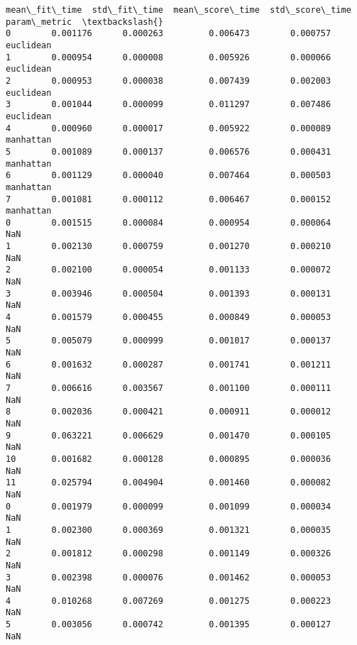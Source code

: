 \documentclass[11pt]{article}
\makeatletter
\newcommand{\boxspacing}{\kern\kvtcb@left@rule\kern\kvtcb@boxsep}
\newcommand{\prompt}[4]{
        {\ttfamily\llap{{\color{#2}[#3]:\hspace{3pt}#4}}\vspace{-\baselineskip}}
    }
\makeatother
\begin{document}
            \begin{tcolorbox}[breakable, size=fbox, boxrule=.5pt, pad at break*=1mm, opacityfill=0]
\prompt{Out}{outcolor}{35}{\boxspacing}
\begin{Verbatim}[commandchars=\\\{\}]
    mean\_fit\_time  std\_fit\_time  mean\_score\_time  std\_score\_time param\_metric  \textbackslash{}
0        0.001176      0.000263         0.006473        0.000757    euclidean
1        0.000954      0.000008         0.005926        0.000066    euclidean
2        0.000953      0.000038         0.007439        0.002003    euclidean
3        0.001044      0.000099         0.011297        0.007486    euclidean
4        0.000960      0.000017         0.005922        0.000089    manhattan
5        0.001089      0.000137         0.006576        0.000431    manhattan
6        0.001129      0.000040         0.007464        0.000503    manhattan
7        0.001081      0.000112         0.006467        0.000152    manhattan
0        0.001515      0.000084         0.000954        0.000064          NaN
1        0.002130      0.000759         0.001270        0.000210          NaN
2        0.002100      0.000054         0.001133        0.000072          NaN
3        0.003946      0.000504         0.001393        0.000131          NaN
4        0.001579      0.000455         0.000849        0.000053          NaN
5        0.005079      0.000999         0.001017        0.000137          NaN
6        0.001632      0.000287         0.001741        0.001211          NaN
7        0.006616      0.003567         0.001100        0.000111          NaN
8        0.002036      0.000421         0.000911        0.000012          NaN
9        0.063221      0.006629         0.001470        0.000105          NaN
10       0.001682      0.000128         0.000895        0.000036          NaN
11       0.025794      0.004904         0.001460        0.000082          NaN
0        0.001979      0.000099         0.001099        0.000034          NaN
1        0.002300      0.000369         0.001321        0.000035          NaN
2        0.001812      0.000298         0.001149        0.000326          NaN
3        0.002398      0.000076         0.001462        0.000053          NaN
4        0.010268      0.007269         0.001275        0.000223          NaN
5        0.003056      0.000742         0.001395        0.000127          NaN


\end{Verbatim}
\end{tcolorbox}
\end{document}
